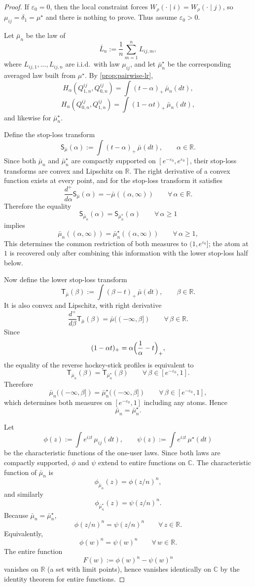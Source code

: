 \documentclass[11pt]{amsart}
\theoremstyle{definition}
\newcommand{\R}{\mathbb R}
\begin{document}
\begin{proof}
If $\varepsilon_0=0$, then the local constraint forces $W_\rho(\cdot\mid i)=W_\rho(\cdot\mid j)$, so $\mu_{ij}=\delta_1=\mu^\star$ and there is nothing to prove. Thus assume $\varepsilon_0>0$.

Let $\bar\mu_n$ be the law of
\[
\bar L_n:=\frac1n\sum_{m=1}^n L_{ij,m},
\]
where $L_{ij,1},\dots,L_{ij,n}$ are i.i.d.\ with law $\mu_{ij}$, and let $\bar\mu_n^\star$ be the corresponding averaged law built from $\mu^\star$. By \cref{prop:pairwise-lr},
\[
H_\alpha(Q_{1,n}^{ij},Q_{0,n}^{ij})=\int (t-\alpha)_+\,\bar\mu_n(dt),
\]
\[
H_\alpha(Q_{0,n}^{ij},Q_{1,n}^{ij})=\int (1-\alpha t)_+\,\bar\mu_n(dt),
\]
and likewise for $\bar\mu_n^\star$.

Define the stop-loss transform
\[
\mathsf S_{\bar\mu}(\alpha):=\int (t-\alpha)_+\,\bar\mu(dt),\qquad \alpha\in\R.
\]
Since both $\bar\mu_n$ and $\bar\mu_n^\star$ are compactly supported on $[e^{-\varepsilon_0},e^{\varepsilon_0}]$, their stop-loss transforms are convex and Lipschitz on $\R$. The right derivative of a convex function exists at every point, and for the stop-loss transform it satisfies
\[
\frac{d^+}{d\alpha}\mathsf S_{\bar\mu}(\alpha)=-\bar\mu((\alpha,\infty))
\qquad \forall\,\alpha\in\R.
\]
Therefore the equality
\[
\mathsf S_{\bar\mu_n}(\alpha)=\mathsf S_{\bar\mu_n^\star}(\alpha)\qquad \forall\,\alpha\ge 1
\]
implies
\[
\bar\mu_n((\alpha,\infty))=\bar\mu_n^\star((\alpha,\infty))
\qquad \forall\,\alpha\ge 1,
\]
This determines the common restriction of both measures to $(1,e^{\varepsilon_0}]$; the atom at $1$ is recovered only after combining this information with the lower stop-loss half below.

Now define the lower stop-loss transform
\[
\mathsf T_{\bar\mu}(\beta):=\int (\beta-t)_+\,\bar\mu(dt),\qquad \beta\in\R.
\]
It is also convex and Lipschitz, with right derivative
\[
\frac{d^+}{d\beta}\mathsf T_{\bar\mu}(\beta)=\bar\mu((-\infty,\beta])
\qquad \forall\,\beta\in\R.
\]
Since
\[
(1-\alpha t)_+=\alpha\Bigl(\frac1\alpha-t\Bigr)_+,
\]
the equality of the reverse hockey-stick profiles is equivalent to
\[
\mathsf T_{\bar\mu_n}(\beta)=\mathsf T_{\bar\mu_n^\star}(\beta)
\qquad\forall\,\beta\in[e^{-\varepsilon_0},1].
\]
Therefore
\[
\bar\mu_n((-\infty,\beta])=\bar\mu_n^\star((-\infty,\beta])
\qquad \forall\,\beta\in[e^{-\varepsilon_0},1],
\]
which determines both measures on $[e^{-\varepsilon_0},1]$ including any atoms. Hence
\[
\bar\mu_n=\bar\mu_n^\star.
\]

Let
\[
\phi(z):=\int e^{izt}\,\mu_{ij}(dt),
\qquad
\psi(z):=\int e^{izt}\,\mu^\star(dt)
\]
be the characteristic functions of the one-user laws. Since both laws are compactly supported, $\phi$ and $\psi$ extend to entire functions on $\mathbb C$. The characteristic function of $\bar\mu_n$ is
\[
\phi_{\bar\mu_n}(z)=\phi(z/n)^n,
\]
and similarly
\[
\phi_{\bar\mu_n^\star}(z)=\psi(z/n)^n.
\]
Because $\bar\mu_n=\bar\mu_n^\star$,
\[
\phi(z/n)^n=\psi(z/n)^n\qquad \forall\, z\in\R.
\]
Equivalently,
\[
\phi(w)^n=\psi(w)^n\qquad \forall\,w\in\R.
\]
The entire function
\[
F(w):=\phi(w)^n-\psi(w)^n
\]
vanishes on $\R$ (a set with limit points), hence vanishes identically on $\mathbb C$ by the identity theorem for entire functions.


\end{proof}
\end{document}
